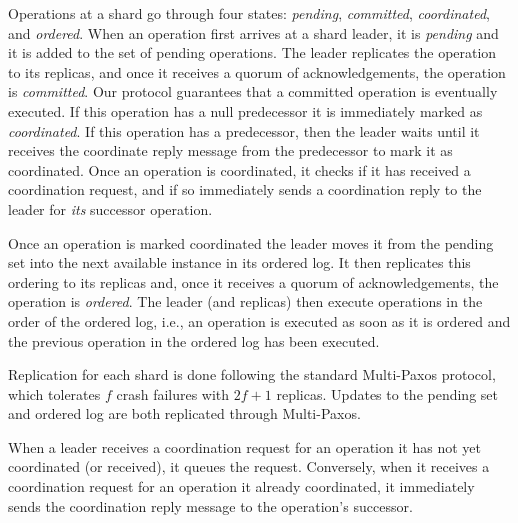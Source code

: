 Operations at a shard go through four states:
\textit{pending},
\textit{committed},
\textit{coordinated},
and
\textit{ordered}.
When an operation first arrives at a shard leader, it is \textit{pending} and it is added to the set of pending operations.
The leader replicates the operation to its replicas, and once it receives a quorum of acknowledgements,
the operation is \textit{committed}.
Our protocol guarantees that a committed operation is eventually executed.
If this operation has a null predecessor it is immediately marked as \textit{coordinated}.
If this operation has a predecessor, then the leader waits until it receives the coordinate reply message from the predecessor to mark it as coordinated.
Once an operation is coordinated, it checks if it has received a coordination request, and if so immediately sends a coordination reply to the leader for \textit{its} successor operation.

Once an operation is marked coordinated the leader moves it from the pending set
into the next available instance in its ordered log.  It then replicates this
ordering to its replicas and, once it receives a quorum of acknowledgements, the
operation is \textit{ordered}.
The leader (and replicas) then execute operations in the order of the ordered log, i.e., an operation is executed as soon as it is ordered and the previous operation in the ordered log has been executed.


Replication for each shard is done following the standard Multi-Paxos protocol, which tolerates $f$ crash failures with $2f+1$ replicas.
Updates to the pending set and ordered log are both replicated through Multi-Paxos.

When a leader receives a coordination request for an operation it has not yet coordinated (or received), it queues the request.
Conversely, when it receives a coordination request for an operation it already coordinated, it immediately sends the coordination reply message to the operation's successor.


